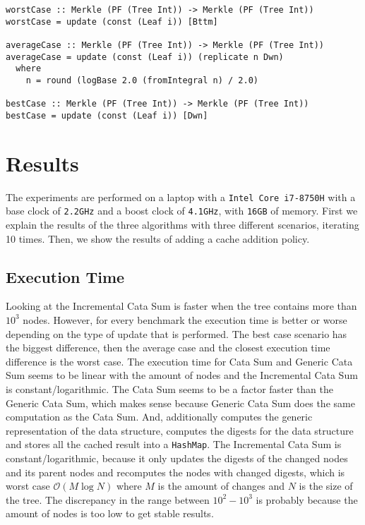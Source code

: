 \begin{verbatim}
worstCase :: Merkle (PF (Tree Int)) -> Merkle (PF (Tree Int))
worstCase = update (const (Leaf i)) [Bttm]

averageCase :: Merkle (PF (Tree Int)) -> Merkle (PF (Tree Int))
averageCase = update (const (Leaf i)) (replicate n Dwn)
  where
    n = round (logBase 2.0 (fromIntegral n) / 2.0)

bestCase :: Merkle (PF (Tree Int)) -> Merkle (PF (Tree Int))
bestCase = update (const (Leaf i)) [Dwn]
\end{verbatim}

\section{Results}

The experiments are performed on a laptop with a \texttt{Intel Core i7-8750H} with a base clock of \texttt{2.2GHz} and a boost clock of \texttt{4.1GHz}, with \texttt{16GB} of memory. First we explain the results of the three algorithms with three different scenarios, iterating 10 times. Then, we show the results of adding a cache addition policy.

\subsection{Execution Time}
Looking at  the Incremental Cata Sum is faster when the tree contains more than $10^3$ nodes. However, for every benchmark the execution time is better or worse depending on the type of update that is performed. The best case scenario has the biggest difference, then the average case and the closest execution time difference is the worst case. The execution time for Cata Sum and Generic Cata Sum seems to be linear with the amount of nodes and the Incremental Cata Sum is constant/logarithmic. The Cata Sum seems to be a factor faster than the Generic Cata Sum, which makes sense because Generic Cata Sum does the same computation as the Cata Sum. And, additionally computes the generic representation of the data structure, computes the digests for the data structure and stores all the cached result into a \texttt{HashMap}. The Incremental Cata Sum is constant/logarithmic, because it only updates the digests of the changed nodes and its parent nodes and recomputes the nodes with changed digests, which is worst case $\mathcal{O}(M \log{N})$ where $M$ is the amount of changes and $N$ is the size of the tree. The discrepancy in the range between $10^2 - 10^3$ is probably because the amount of nodes is too low to get stable results.

